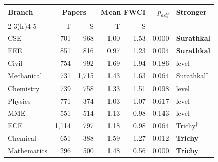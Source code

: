 \begin{tabular}{@{}lrrrrrl@{}}
\toprule
Branch & \multicolumn{2}{c}{Papers} & \multicolumn{2}{c}{Mean FWCI} & $p_{adj}$ & Stronger \\
\cmidrule(lr){2-3}\cmidrule(lr){4-5}
 & T & S & T & S & & \\
\midrule
CSE & 701 & 968 & 1.00 & 1.53 & 0.000 & \textbf{Surathkal} \\
EEE & 851 & 816 & 0.97 & 1.23 & 0.004 & \textbf{Surathkal} \\
Civil & 754 & 992 & 1.69 & 1.94 & 0.186 & level \\
Mechanical & 731 & 1{,}715 & 1.43 & 1.63 & 0.064 & Surathkal$^\dagger$ \\
Chemistry & 739 & 758 & 1.33 & 1.51 & 0.098 & level \\
Physics & 771 & 374 & 1.03 & 1.07 & 0.617 & level \\
MME & 551 & 514 & 1.13 & 0.98 & 0.143 & level \\
ECE & 1{,}114 & 797 & 1.18 & 0.98 & 0.064 & Trichy$^\dagger$ \\
Chemical & 651 & 388 & 1.59 & 1.27 & 0.012 & \textbf{Trichy} \\
Mathematics & 296 & 500 & 1.48 & 0.56 & 0.000 & \textbf{Trichy} \\
\bottomrule
\end{tabular}
